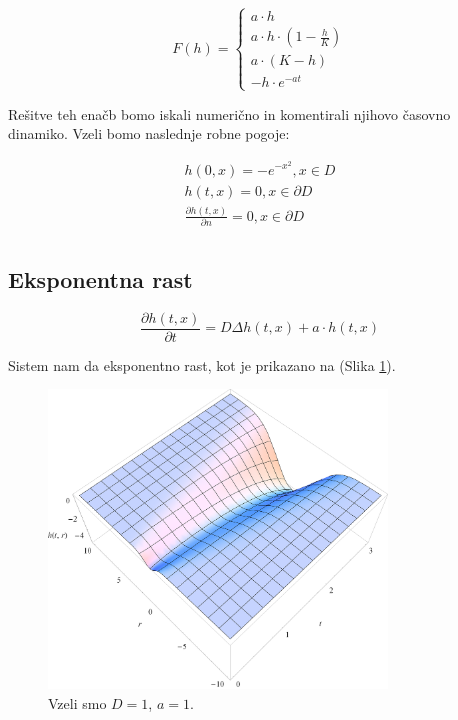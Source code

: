 \documentclass[a4paper, twoside, 12pt]{book}
\begin{document}
    \begin{equation}
      F(h) = \left \{ \begin{array}{lr} 
        a \cdot h \\
        a \cdot h \cdot (1 - \frac{h}{K}) \\
        a \cdot (K - h) \\
        - h \cdot e^{-a t}
      \end{array} \right. 
      \label{difuzijska-variacije}
    \end{equation}

    Rešitve teh enačb bomo iskali numerično in komentirali njihovo časovno dinamiko. Vzeli bomo naslednje robne pogoje:

    \begin{equation}
      \begin{aligned}
        h(0,x) =  - e^{-x^2}, x \in D \\
        h(t,x) = 0, x \in \partial D \\
        \frac{\partial h(t,x)}{\partial n} = 0, x \in \partial D \\
      \end{aligned}
    \end{equation}

    \subsection{Eksponentna rast}

    \begin{equation}
      \frac{ \partial h(t,x) }{ \partial t} = D \Delta h(t,x) + a \cdot h(t,x)
      \label{difuzija-eksponentna-rast}
    \end{equation}

    Sistem nam da eksponentno rast, kot je prikazano na (Slika \ref{fig:difuzija-eksponentna-rast}).

    \begin{figure}[h!]
      \begin{center}
        \includegraphics[width=9cm]{slike/difuzija-eksponentna-rast2}
      \end{center}
      \caption{Vzeli smo $D=1$, $a=1$.}
      \label{fig:difuzija-eksponentna-rast}
    \end{figure}
\end{document}
